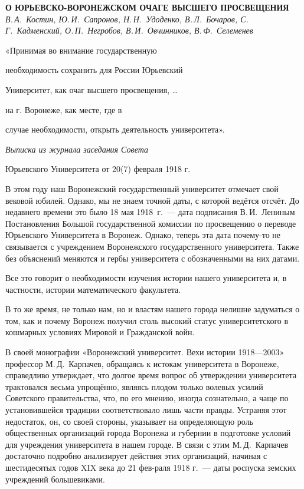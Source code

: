 \begin{center}{ \bf  О ЮРЬЕВСКО-ВОРОНЕЖСКОМ ОЧАГЕ ВЫСШЕГО ПРОСВЕЩЕНИЯ}\\
{\it В.\,А.~Костин, Ю.\,И.~Сапронов, Н.\,Н.~Удоденко, В.\,Л.~Бочаров, С.\,Г.~Кадменский, О.\,П.~Негробов, В.\,И.~Овчинников, В.\,Ф.~Селеменев
} \\
\end{center}

\begin{flushright}
«Принимая во внимание государственную

необходимость сохранить для России Юрьевский

Университет, как очаг высшего просвещения, \ldots

 на г. Воронеже, как месте, где в

случае необходимости, открыть деятельность университета».

{\it Выписка из журнала заседания Совета

Юрьевского Университета от 20(7) февраля 1918 г.}
\end{flushright}
В этом году наш Воронежский государственный университет отмечает свой вековой юбилей.
Однако, мы не знаем точной даты, с которой ведётся отсчёт.
До недавнего времени это было 18 мая 1918~г.~---
дата подписания В.\,И.~Лениным Постановления Большой государственной комиссии по просвещению
о переводе Юрьевского Университета в Воронеж.
Однако, теперь эта дата почему-то не связывается с учреждением Воронежского государственного университета.
Также без объяснений меняются и гербы университета с обозначенными на них датами.

Все это говорит о необходимости изучения истории нашего университета и, в частности, истории математического факультета.

В	то же время, не только нам, но и властям нашего города нелишне задуматься о том, как и почему Воронеж получил столь высокий статус университетского в кошмарных условиях Мировой и Гражданской войн.

В	своей монографии «Воронежский университет. Вехи истории 1918—2003» профессор М.\,Д.~Карпачев, обращаясь к истокам университета в Воронеже, справедливо утверждает, что долгое время вопрос об утверждении университета трактовался весьма упрощённо, являясь плодом только волевых усилий Советского правительства, что, по его мнению, иногда сознательно, а чаще по установившейся традиции соответствовало лишь части правды. Устраняя этот недостаток, он, со своей стороны, указывает на определяющую роль общественных организаций города Воронежа и губернии в подготовке условий для учреждения университета в нашем городе. В связи с	этим М.\,Д.~Карпачев достаточно подробно анализирует действия этих организаций, начиная с шестидесятых годов XIX века до 21 фев-раля 1918 г.~--- даты роспуска земских учреждений большевиками.

